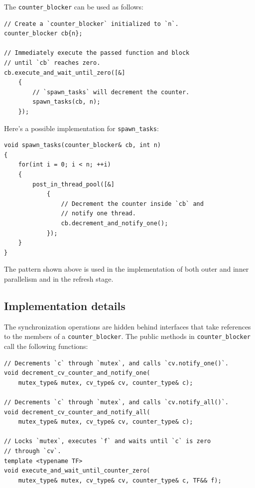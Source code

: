 \documentclass[oneside, 12pt, a4paper, openany]{book}
\begin{document}
The
\texttt{counter_blocker}
can be used as follows:

\begin{verbatim}
// Create a `counter_blocker` initialized to `n`.
counter_blocker cb{n};

// Immediately execute the passed function and block
// until `cb` reaches zero.
cb.execute_and_wait_until_zero([&]
    {
        // `spawn_tasks` will decrement the counter.
        spawn_tasks(cb, n);
    });
\end{verbatim}

Here's a possible implementation for
\texttt{spawn_tasks}:

\begin{verbatim}
void spawn_tasks(counter_blocker& cb, int n)
{
    for(int i = 0; i < n; ++i)
    {
        post_in_thread_pool([&]
            {
                // Decrement the counter inside `cb` and
                // notify one thread.
                cb.decrement_and_notify_one();
            });
    }
}
\end{verbatim}

The pattern shown above is used in the implementation of both outer and
inner parallelism and in the refresh stage.

\subsection{Implementation details}\label{implementation-details}

The synchronization operations are hidden behind interfaces that take
references to the members of a
\texttt{counter_blocker}.
The public methods in
\texttt{counter_blocker}
call the following functions:

\begin{verbatim}
// Decrements `c` through `mutex`, and calls `cv.notify_one()`.
void decrement_cv_counter_and_notify_one(
    mutex_type& mutex, cv_type& cv, counter_type& c);

// Decrements `c` through `mutex`, and calls `cv.notify_all()`.
void decrement_cv_counter_and_notify_all(
    mutex_type& mutex, cv_type& cv, counter_type& c);

// Locks `mutex`, executes `f` and waits until `c` is zero
// through `cv`.
template <typename TF>
void execute_and_wait_until_counter_zero(
    mutex_type& mutex, cv_type& cv, counter_type& c, TF&& f);
\end{verbatim}
\end{document}
